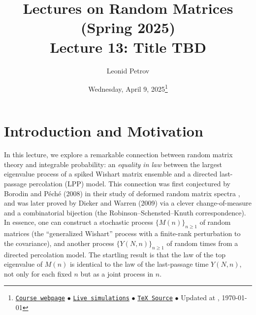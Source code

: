 \documentclass[letterpaper,11pt,oneside,reqno]{article}
\numberwithin{equation}{section}
\theoremstyle{definition}
\begin{document}
\title{Lectures on Random Matrices
(Spring 2025)
\\Lecture 13: Title TBD}


\date{Wednesday, April 9, 2025\footnote{\href{https://lpetrov.cc/rmt25/}{\texttt{Course webpage}}
$\bullet$ \href{https://lpetrov.cc/simulations/model/random-matrices/}{\texttt{Live simulations}}
$\bullet$ \href{https://lpetrov.cc/rmt25/rmt25-notes/rmt2025-l13.tex}{\texttt{TeX Source}}
$\bullet$
Updated at \currenttime, \today}}



\author{Leonid Petrov}


\maketitle



\section{Introduction and Motivation}
In this lecture, we explore a remarkable connection between random matrix theory and integrable probability: an \emph{equality in law} between the largest eigenvalue process of a spiked Wishart matrix ensemble and a directed last-passage percolation (LPP) model. This connection was first conjectured by Borodin and P\'ech\'e (2008) in their study of deformed random matrix spectra \cite{BorodinPeche2009}, and was later proved by Dieker and Warren (2009) \cite{diekerWarren2008determinantal} via a clever change-of-measure and a combinatorial bijection (the Robinson--Schensted--Knuth correspondence). In essence, one can construct a stochastic process $\{M(n)\}_{n\ge1}$ of random matrices (the ``generalized Wishart'' process with a finite-rank perturbation to the covariance), and another process $\{Y(N,n)\}_{n\ge1}$ of random times from a directed percolation model. The startling result is that the law of the top eigenvalue of $M(n)$ is identical to the law of the last-passage time $Y(N,n)$, not only for each fixed $n$ but as a joint process in $n$.
\end{document}

